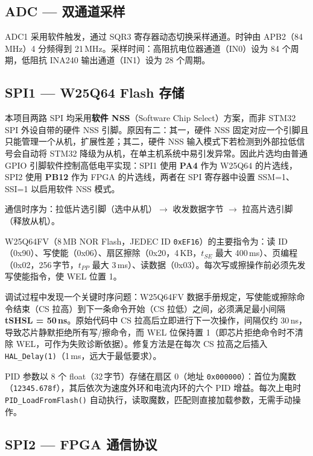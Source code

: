 \documentclass[12pt, a4paper]{ctexrep}
\begin{document}
\subsection{ADC — 双通道采样}

ADC1 采用软件触发，通过 SQR3 寄存器动态切换采样通道。时钟由 APB2（84\,MHz）4 分频得到 21\,MHz。采样时间：高阻抗电位器通道（IN0）设为 84 个周期，低阻抗 INA240 输出通道（IN1）设为 28 个周期。

\subsection{SPI1 — W25Q64 Flash 存储}

本项目两路 SPI 均采用\textbf{软件 NSS}（Software Chip Select）方案，而非 STM32 SPI 外设自带的硬件 NSS 引脚。原因有二：其一，硬件 NSS 固定对应一个引脚且只能管理一个从机，扩展性差；其二，硬件 NSS 输入模式下若检测到外部拉低信号会自动将 STM32 降级为从机，在单主机系统中易引发异常。因此片选均由普通 GPIO 引脚软件控制高低电平实现：SPI1 使用 \textbf{PA4} 作为 W25Q64 的片选线，SPI2 使用 \textbf{PB12} 作为 FPGA 的片选线，两者在 SPI 寄存器中设置 SSM=1、SSI=1 以启用软件 NSS 模式。

通信时序为：拉低片选引脚（选中从机）$\to$ 收发数据字节 $\to$ 拉高片选引脚（释放从机）。

W25Q64FV（8\,MB NOR Flash，JEDEC ID \texttt{0xEF16}）的主要指令为：读 ID（0x90）、写使能（0x06）、扇区擦除（0x20，4\,KB，$t_{SE}$ 最大 400\,ms）、页编程（0x02，256\,字节，$t_{PP}$ 最大 3\,ms）、读数据（0x03）。每次写或擦操作前必须先发写使能指令，使 WEL 位置 1。

调试过程中发现一个关键时序问题：W25Q64FV 数据手册规定，写使能或擦除命令结束（CS 拉高）到下一条命令开始（CS 拉低）之间，必须满足最小间隔 \textbf{tSHSL = 50\,ns}。原始代码中 CS 拉高后立即进行下一次操作，间隔仅约 30\,ns，导致芯片静默拒绝所有写/擦命令，而 WEL 位保持置 1（即芯片拒绝命令时不清除 WEL，可作为失败诊断依据）。修复方法是在每次 CS 拉高之后插入 \texttt{HAL\_Delay(1)}（1\,ms，远大于最低要求）。

PID 参数以 8 个 float（32\,字节）存储在扇区 0（地址 \texttt{0x000000}）：首位为魔数（\texttt{12345.678f}），其后依次为速度外环和电流内环的六个 PID 增益。每次上电时 \texttt{PID\_LoadFromFlash()} 自动执行，读取魔数，匹配则直接加载参数，无需手动操作。

\subsection{SPI2 — FPGA 通信协议}
\end{document}
